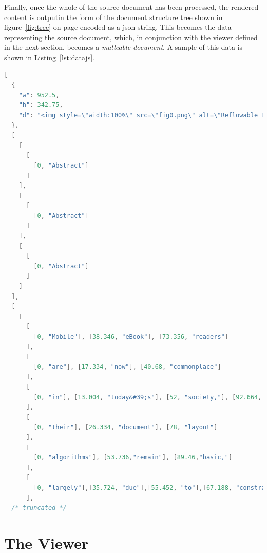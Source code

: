 Finally, once the whole of the source document has been processed, the rendered content is output\ed in the form of the document structure tree shown in figure~\ref{fig:tree} on page \pageref{fig:tree}\ed encoded as a \gls{json} string. This becomes the data representing the source document, which, in conjunction with the viewer defined in the next section, becomes a \emph{malleable document}. A sample of this data is shown in Listing~\ref{lst:datajs}.

\begin{lstlisting}[label=lst:datajs,captionpos=b,float,language=c,stringstyle=\color{blue},basicstyle=\ttfamily\footnotesize,caption={[Excerpt from JavaScript data file]Excerpt from JavaScript data file representing a 3-galley document. Note that the title "Abstract" is treated as any normal paragraph and, as for any paragraph, is typeset once for each galley rendering (despite there being no difference between each rendering in this case). The first rendering of the first paragraph of the abstract begins below. For brevity's sake, subsequent renderings are not shown, but since the following galleys are typeset with a different measure, the spacing and words per line will differ. At the top is an object representing a float, which contains values for \textcolor{red}width, \textcolor{red}height, and \textcolor{red}data.}]
[
  {
    "w": 952.5,
    "h": 342.75,
    "d": "<img style=\"width:100%\" src=\"fig0.png\" alt=\"Reflowable Documents Composed from\nPre-rendered Atomic Components\nAlexander J. Pinkney\nSteven R. Bagley\nDavid F. Brailsford\nDocument Engineering Lab.\nSchool of Computer Science\nUniversity of Nottingham\nNottingham, NG8 1BB, UK\n{azp|srb|dfb}@cs.nott.ac.uk\n\">"
  },
  [
    [
      [
        [0, "Abstract"]
      ]
    ],
    [
      [
        [0, "Abstract"]
      ]
    ],
    [
      [
        [0, "Abstract"]
      ]
    ]
  ],
  [
    [
      [
        [0, "Mobile"], [38.346, "eBook"], [73.356, "readers"]
      ],
      [
        [0, "are"], [17.334, "now"], [40.68, "commonplace"]
      ],
      [
        [0, "in"], [13.004, "today&#39;s"], [52, "society,"], [92.664, "but"]
      ],
      [
        [0, "their"], [26.334, "document"], [78, "layout"]
      ],
      [
        [0, "algorithms"], [53.736,"remain"], [89.46,"basic,"]
      ],
      [
        [0, "largely"],[35.724, "due"],[55.452, "to"],[67.188, "constraints"]
      ],
  /* truncated */

\end{lstlisting}


\section{The Viewer}
\label{sec:viewer}

